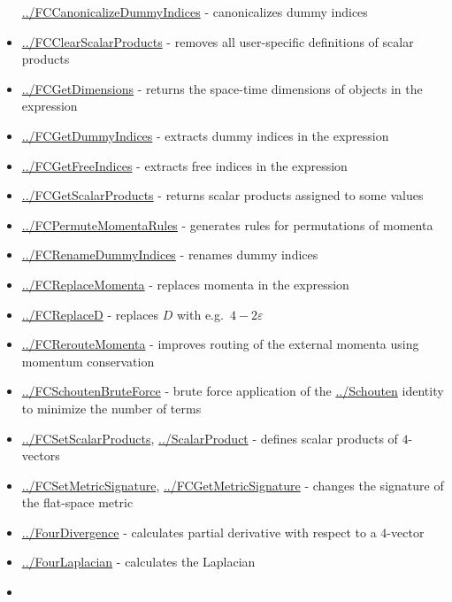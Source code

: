 \documentclass[../FeynCalcManual.tex]{subfiles}
\begin{document}
\begin{itemize}
  \hyperlink{../fccanonicalizedummyindices}{../FCCanonicalizeDummyIndices}
  - canonicalizes dummy indices
\item
  \hyperlink{../fcclearscalarproducts}{../FCClearScalarProducts} -
  removes all user-specific definitions of scalar products
\item
  \hyperlink{../fcgetdimensions}{../FCGetDimensions} - returns the
  space-time dimensions of objects in the expression
\item
  \hyperlink{../fcgetdummyindices}{../FCGetDummyIndices} - extracts
  dummy indices in the expression
\item
  \hyperlink{../fcgetfreeindices}{../FCGetFreeIndices} - extracts free
  indices in the expression
\item
  \hyperlink{../fcgetscalarproducts}{../FCGetScalarProducts} - returns
  scalar products assigned to some values
\item
  \hyperlink{../fcpermutemomentarules}{../FCPermuteMomentaRules} -
  generates rules for permutations of momenta
\item
  \hyperlink{../fcrenamedummyindices}{../FCRenameDummyIndices} - renames
  dummy indices
\item
  \hyperlink{../fcreplacemomenta}{../FCReplaceMomenta} - replaces
  momenta in the expression
\item
  \hyperlink{../fcreplaced}{../FCReplaceD} - replaces \(D\) with
  e.g.~\(4-2 \varepsilon\)
\item
  \hyperlink{../fcreroutemomenta}{../FCRerouteMomenta} - improves
  routing of the external momenta using momentum conservation
\item
  \hyperlink{../fcschoutenbruteforce}{../FCSchoutenBruteForce} - brute
  force application of the \hyperlink{../schouten}{../Schouten} identity
  to minimize the number of terms
\item
  \hyperlink{../fcsetscalarproducts}{../FCSetScalarProducts},
  \hyperlink{../scalarproduct}{../ScalarProduct} - defines scalar
  products of \(4\)-vectors
\item
  \hyperlink{../fcsetmetricsignature}{../FCSetMetricSignature},
  \hyperlink{../fcgetmetricsignature}{../FCGetMetricSignature} - changes
  the signature of the flat-space metric
\item
  \hyperlink{../fourdivergence}{../FourDivergence} - calculates partial
  derivative with respect to a \(4\)-vector
\item
  \hyperlink{../fourlaplacian}{../FourLaplacian} - calculates the
  Laplacian
\item

\end{itemize}
\end{document}
